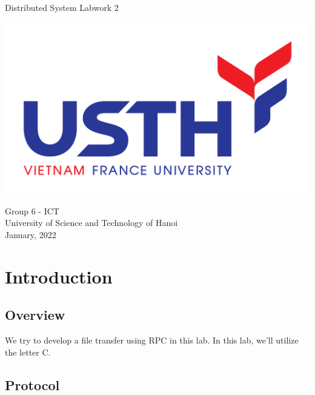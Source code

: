 \documentclass[13pt]{article}
\begin{document}
\begin{titlepage}
    \begin{center}
        \vspace*{1.8cm}
        \Large
        Distributed System Labwork 2\\
        \Large
        \vspace{0.5cm}
        \begin{center}
            \includegraphics[scale=1.0]{logo USTH-01.PNG}
        \end{center}  
        \vspace{0.5cm}
            Group 6 - ICT\\
        \vspace{0.5cm}
            University of Science and Technology of Hanoi\\
        \vspace{0.5cm}
            January, 2022
        \vfill
          
   \end{center}
\end{titlepage}

\newpage
\tableofcontents
\newpage

\section{Introduction}
\subsection{Overview}
\noindent%
We try to develop a file transfer using RPC in this lab. In this lab, we'll utilize the letter C.

\subsection{Protocol}
\end{document}
